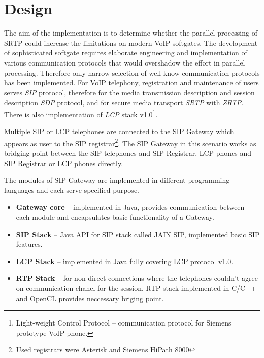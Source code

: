 \chapter{Design}\label{chapter:design}%
The aim of the implementation is to determine whether the parallel processing
of SRTP could increase the limitations on modern VoIP softgates. The development
of sophisticated softgate requires elaborate engineering and implementation
of various communication protocols that would overshadow the effort in parallel
processing. Therefore only narrow selection of well know communication protocols
has been implemented. For VoIP telephony, registration and maintenance of users
serves \textit{SIP} protocol, therefore for the media transmission description
and session description \textit{SDP} protocol, and for secure media transport 
\textit{SRTP} with \textit{ZRTP}. There is also implementation of \textit{LCP} 
stack v1.0\footnote{ Light-weight Control Protocol -- communication protocol for
Siemens prototype VoIP phone.}.




Multiple SIP or LCP telephones are connected to the SIP Gateway which appears as
user to the SIP registrar\footnote{ Used registrars were Asterisk and Siemens 
HiPath 8000}. The SIP Gateway in this scenario works as bridging point between 
the SIP telephones and SIP Registrar, LCP phones and SIP Registrar or LCP phones
directly.

The modules of SIP Gateway are implemented in different programming languages
and each serve specified purpose.
\begin{itemize}
\item \textbf{Gateway core} -- implemented in Java, provides communication 
between each module and encapsulates basic functionality of a Gateway.
\item \textbf{SIP Stack} -- Java API for SIP stack called JAIN SIP\cite{jainsip}, 
implemented basic SIP features.
\item \textbf{LCP Stack} -- implemented in Java fully covering LCP protocol v1.0.
\item \textbf{RTP Stack} -- for non-direct connections where the telephones 
couldn't agree on communication chanel for the session, RTP stack implemented in 
C/C++ and OpenCL provides neccessary briging point.
\end{itemize}


